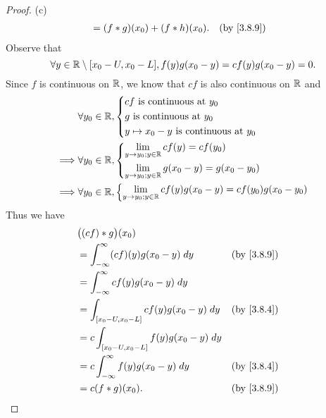 \begin{proof}{(c)}
\begin{align*}
     & = (f * g)(x_0) + (f * h)(x_0).                                                                           &  & \by{3.8.9}
  \end{align*}
  Observe that
  \[
    \forall y \in \mathbb{R} \setminus [x_0 - U, x_0 - L], f(y) g(x_0 - y) = c f(y) g(x_0 - y) = 0.
  \]
  Since \(f\) is continuous on \(\mathbb{R}\), we know that \(cf\) is also continuous on \(\mathbb{R}\) and
  \begin{align*}
             & \forall y_0 \in \mathbb{R}, \begin{dcases}
                                     cf \text{ is continuous at } y_0 \\
                                     g \text{ is continuous at } y_0  \\
                                     y \mapsto x_0 - y \text{ is continuous at } y_0
                                   \end{dcases}                     \\
    \implies & \forall y_0 \in \mathbb{R}, \begin{dcases}
                                     \lim_{y \to y_0 ; y \in \mathbb{R}} cf(y) = cf(y_0) \\
                                     \lim_{y \to y_0 ; y \in \mathbb{R}} g(x_0 - y) = g(x_0 - y_0)
                                   \end{dcases}               \\
    \implies & \forall y_0 \in \mathbb{R}, \begin{dcases}
                                     \lim_{y \to y_0 ; y \in \mathbb{R}} cf(y) g(x_0 - y) = cf(y_0) g(x_0 - y_0)
                                   \end{dcases}
  \end{align*}
  Thus we have
  \begin{align*}
     & \big((cf) * g\big)(x_0)                                             \\
     & = \int_{-\infty}^\infty (cf)(y) g(x_0 - y) \; dy    &  & \by{3.8.9} \\
     & = \int_{-\infty}^\infty c f(y) g(x_0 - y) \; dy                     \\
     & = \int_{[x_0 - U, x_0 - L]} c f(y) g(x_0 - y) \; dy &  & \by{3.8.4} \\
     & = c \int_{[x_0 - U, x_0 - L]} f(y) g(x_0 - y) \; dy                 \\
     & = c \int_{-\infty}^\infty f(y) g(x_0 - y) \; dy     &  & \by{3.8.4} \\
     & = c (f * g)(x_0).                                   &  & \by{3.8.9}

\end{align*}
\end{proof}

